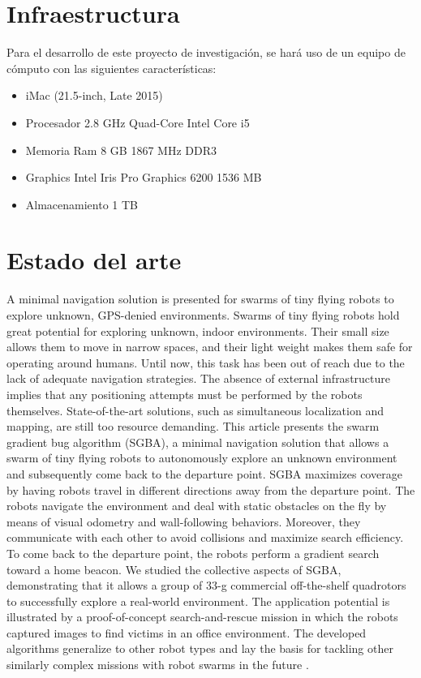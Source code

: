 \documentclass[11pt,epsf,times]{article}
\begin{document}
\section*{Infraestructura}

Para el desarrollo de este proyecto de investigaci\'{o}n, se har\'{a} uso de un equipo de c\'{o}mputo con las siguientes caracter\'{i}sticas:

\begin{itemize}
\item iMac (21.5-inch, Late 2015)
\item Procesador 2.8 GHz Quad-Core Intel Core i5
\item Memoria Ram 8 GB 1867 MHz DDR3
\item Graphics Intel Iris Pro Graphics 6200 1536 MB
\item Almacenamiento 1 TB
\end{itemize}

\newpage
\section*{Estado del arte}

A minimal navigation solution is presented for swarms of tiny flying robots to explore unknown, GPS-denied environments. Swarms of tiny flying robots hold great potential for exploring unknown, indoor environments. Their small size allows them to move in narrow spaces, and their light weight makes them safe for operating around humans. Until now, this task has been out of reach due to the lack of adequate navigation strategies. The absence of external infrastructure implies that any positioning attempts must be performed by the robots themselves. State-of-the-art solutions, such as simultaneous localization and mapping, are still too resource demanding. This article presents the swarm gradient bug algorithm (SGBA), a minimal navigation solution that allows a swarm of tiny flying robots to autonomously explore an unknown environment and subsequently come back to the departure point. SGBA maximizes coverage by having robots travel in different directions away from the departure point. The robots navigate the environment and deal with static obstacles on the fly by means of visual odometry and wall-following behaviors. Moreover, they communicate with each other to avoid collisions and maximize search efficiency. To come back to the departure point, the robots perform a gradient search toward a home beacon. We studied the collective aspects of SGBA, demonstrating that it allows a group of 33-g commercial off-the-shelf quadrotors to successfully explore a real-world environment. The application potential is illustrated by a proof-of-concept search-and-rescue mission in which the robots captured images to find victims in an office environment. The developed algorithms generalize to other robot types and lay the basis for tackling other similarly complex missions with robot swarms in the future \cite{BUG2019}.\\
\end{document}
